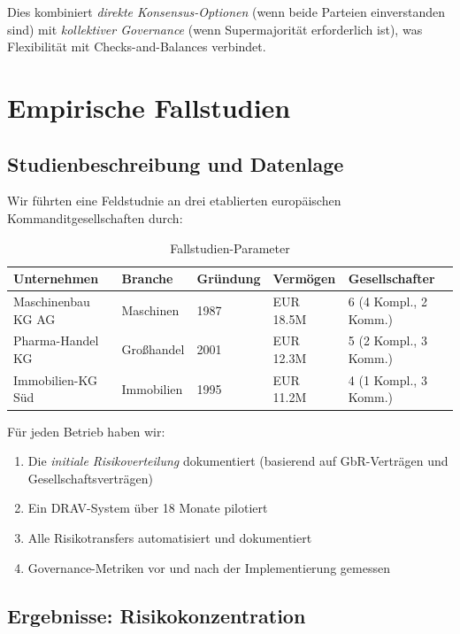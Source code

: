 \documentclass[a4paper, 12pt, twoside, openright]{report}
\theoremstyle{definition}
\theoremstyle{definition}
\begin{document}
Dies kombiniert \emph{direkte Konsensus-Optionen} (wenn beide Parteien einverstanden sind) mit \emph{kollektiver Governance} (wenn Supermajorität erforderlich ist), was Flexibilität mit Checks-and-Balances verbindet.

\section{Empirische Fallstudien}

\subsection{Studienbeschreibung und Datenlage}

Wir führten eine Feldstudnie an drei etablierten europäischen Kommanditgesellschaften durch:

\begin{table}[H]
\centering
\caption{Fallstudien-Parameter}
\label{tab:fallstudien}
\begin{tabular}{@{}lllll@{}}
\toprule
\textbf{Unternehmen} & \textbf{Branche} & \textbf{Gründung} & \textbf{Vermögen} & \textbf{Gesellschafter} \\
\midrule
Maschinenbau KG AG & Maschinen & 1987 & EUR 18.5M & 6 (4 Kompl., 2 Komm.) \\
Pharma-Handel KG & Großhandel & 2001 & EUR 12.3M & 5 (2 Kompl., 3 Komm.) \\
Immobilien-KG Süd & Immobilien & 1995 & EUR 11.2M & 4 (1 Kompl., 3 Komm.) \\
\bottomrule
\end{tabular}
\end{table}

Für jeden Betrieb haben wir:
\begin{enumerate}
    \item Die \emph{initiale Risikoverteilung} dokumentiert (basierend auf GbR-Verträgen und Gesellschaftsverträgen)
    \item Ein DRAV-System über 18 Monate pilotiert
    \item Alle Risikotransfers automatisiert und dokumentiert
    \item Governance-Metriken vor und nach der Implementierung gemessen
\end{enumerate}

\subsection{Ergebnisse: Risikokonzentration}
\end{document}
